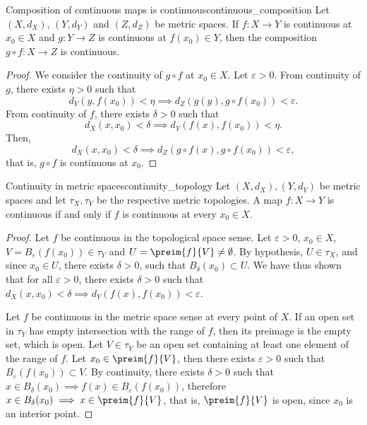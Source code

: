 \begin{proposition}{Composition of continuous maps is continuous}{continuous_composition}
    Let \((X, d_X)\), \((Y, d_Y)\) and \((Z, d_Z)\) be metric spaces. If \(f : X \to Y\) is continuous at \(x_0 \in X\) and \(g : Y \to Z\) is continuous at \(f(x_0) \in Y\), then the composition \(g\circ f : X \to Z\) is continuous.
\end{proposition}
\begin{proof}
    We consider the continuity of \(g\circ f\) at \(x_0 \in X\). Let \(\varepsilon > 0\). From continuity of \(g\), there exists \(\eta > 0\) such that
    \begin{equation*}
        d_Y(y, f(x_0)) < \eta \implies d_Z(g(y), g\circ f(x_0)) < \varepsilon.
    \end{equation*}
    From continuity of \(f\), there exists \(\delta > 0\) such that
    \begin{equation*}
        d_X(x, x_0) < \delta \implies d_Y(f(x), f(x_0)) < \eta.
    \end{equation*}
    Then,
    \begin{equation*}
        d_X(x, x_0) < \delta \implies d_Z(g\circ f(x), g\circ f(x_0)) < \varepsilon,
    \end{equation*}
    that is, \(g\circ f\) is continuous at \(x_0\).
\end{proof}

\begin{theorem}{Continuity in metric spaces}{continuity_topology}
    Let \((X, d_X), (Y, d_Y)\) be metric spaces and let \(\tau_X,\tau_Y\) be the respective metric topologies. A map \(f : X \to Y\) is continuous if and only if \(f\) is continuous at every \(x_0 \in X\).
\end{theorem}
\begin{proof}
    Let \(f\) be continuous in the topological space sense. Let \(\varepsilon > 0\), \(x_0 \in X\), \(V = B_{\varepsilon}(f(x_0)) \in \tau_Y\) and \(U = \preim{f}{V} \neq \emptyset\). By hypothesis, \(U \in \tau_X\), and since \(x_0 \in U\), there exists \(\delta > 0\), such that \(B_\delta(x_0) \subset U\). We have thus shown that for all \(\varepsilon > 0\), there exists \(\delta > 0\) such that \(d_X(x,x_0) < \delta \implies d_Y(f(x), f(x_0)) < \varepsilon\).

    Let \(f\) be continuous in the metric space sense at every point of \(X\). If an open set in \(\tau_Y\) has empty intersection with the range of \(f\), then its preimage is the empty set, which is open. Let \(V \in \tau_Y\) be an open set containing at least one element of the range of \(f\). Let \(x_0 \in \preim{f}{V}\), then there exists \(\varepsilon > 0\) such that \(B_{\varepsilon}(f(x_0)) \subset V\). By continuity, there exists \(\delta > 0\) such that \(x \in B_\delta(x_0) \implies f(x) \in B_\varepsilon(f(x_0))\), therefore \(x \in B_\delta(x_0) \implies x \in \preim{f}{V}\), that is, \(\preim{f}{V}\) is open, since \(x_0\) is an interior point.
\end{proof}

